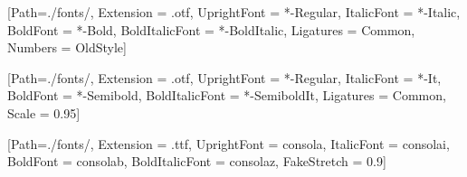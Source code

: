 
\usepackage{fontspec}
\usepackage{xltxtra}


[Path=./fonts/,
  Extension      = .otf,
  UprightFont    = *-Regular,
  ItalicFont     = *-Italic,
  BoldFont       = *-Bold,
  BoldItalicFont = *-BoldItalic,
  Ligatures      = Common,
  Numbers        = OldStyle]


\setsansfont{SourceSans3}[Path=./fonts/,
  Extension      = .otf,
  UprightFont    = *-Regular,
  ItalicFont     = *-It,
  BoldFont       = *-Semibold,
  BoldItalicFont = *-SemiboldIt,
  Ligatures      = Common,
  Scale          = 0.95]

\setmonofont{Consolas}[Path=./fonts/,
  Extension      = .ttf,
  UprightFont    = consola,
  ItalicFont     = consolai,
  BoldFont       = consolab,
  BoldItalicFont = consolaz,
  FakeStretch    = 0.9]


